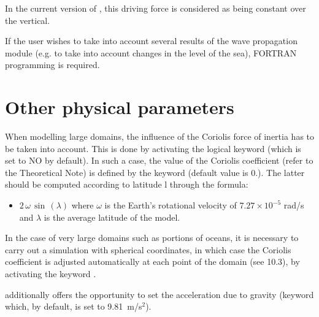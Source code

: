 In the current version of , this driving force is considered as being
constant over the vertical.

If the user wishes to take into account several results of the wave propagation
module (e.g. to take into account changes in the level of the sea), FORTRAN
programming is required.

\section{Other physical parameters}

When modelling large domains, the influence of the Coriolis force of inertia
has to be taken into account. This is done by activating the logical keyword
 (which is set to NO by default). In such a case, the value of
the Coriolis coefficient (refer to the Theoretical Note) is defined by the
keyword  (default value is 0.). The latter should
be computed according to latitude l through the formula:

\begin{itemize}
\item  $2\, \omega \, \sin \, \left(\lambda \right)$ where $\omega$ is the
Earth's rotational velocity of $7.27 \times {10}^{-5}$ rad/s and $\lambda$ is the
average latitude of the model.
\end{itemize}

In the case of very large domains such as portions of oceans, it is necessary
to carry out a simulation with spherical coordinates, in which case the
Coriolis coefficient is adjusted automatically at each point of the domain (see
10.3), by activating the keyword .

 additionally offers the opportunity to set the acceleration due to
gravity (keyword  which, by
default, is set to 9.81~m/s${}^{2}$).
